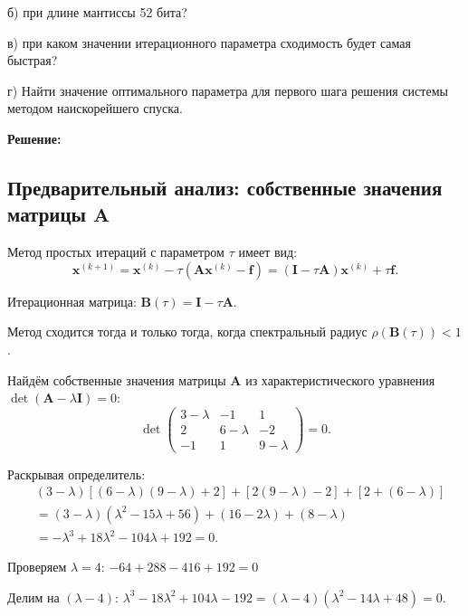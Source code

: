 \documentclass{article}
\begin{document}
б) при длине мантиссы 52 бита?

в) при каком значении итерационного параметра сходимость будет самая быстрая?

г) Найти значение оптимального параметра для первого шага решения системы методом наискорейшего спуска.

\vspace{0.5cm}
\textbf{Решение:}

\subsection*{Предварительный анализ: собственные значения матрицы $\mathbf{A}$}

Метод простых итераций с параметром $\tau$ имеет вид:
\begin{equation}
\mathbf{x}^{(k+1)} = \mathbf{x}^{(k)} - \tau(\mathbf{A}\mathbf{x}^{(k)} - \mathbf{f}) = (\mathbf{I} - \tau\mathbf{A})\mathbf{x}^{(k)} + \tau\mathbf{f}.
\end{equation}

Итерационная матрица: $\mathbf{B}(\tau) = \mathbf{I} - \tau\mathbf{A}$.

Метод сходится тогда и только тогда, когда спектральный радиус $\rho(\mathbf{B}(\tau)) < 1$.

Найдём собственные значения матрицы $\mathbf{A}$ из характеристического уравнения $\det(\mathbf{A} - \lambda\mathbf{I}) = 0$:
\begin{equation}
\det\begin{pmatrix} 3-\lambda & -1 & 1 \\ 2 & 6-\lambda & -2 \\ -1 & 1 & 9-\lambda \end{pmatrix} = 0.
\end{equation}

Раскрывая определитель:
\begin{align}
&(3-\lambda)[(6-\lambda)(9-\lambda) + 2] + [2(9-\lambda) - 2] + [2 + (6-\lambda)] \nonumber \\
&= (3-\lambda)(\lambda^2 - 15\lambda + 56) + (16 - 2\lambda) + (8 - \lambda) \nonumber \\
&= -\lambda^3 + 18\lambda^2 - 104\lambda + 192 = 0.
\end{align}

Проверяем $\lambda = 4$: $-64 + 288 - 416 + 192 = 0$ 

Делим на $(\lambda - 4)$: $\lambda^3 - 18\lambda^2 + 104\lambda - 192 = (\lambda - 4)(\lambda^2 - 14\lambda + 48) = 0$.
\end{document}
